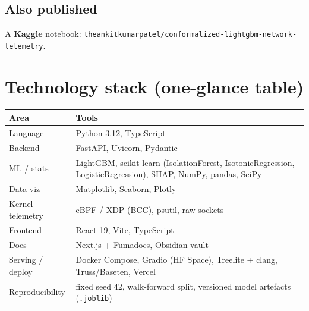 \documentclass[11pt,a4paper]{article}
\begin{document}
\subsection{Also published}
A \textbf{Kaggle} notebook: \texttt{theankitkumarpatel/conformalized-lightgbm-network-telemetry}.

\section{Technology stack (one-glance table)}
\begin{center}
\begin{tabularx}{\linewidth}{@{}p{3.4cm}X@{}}
\toprule
\textbf{Area} & \textbf{Tools} \\
\midrule
Language & Python 3.12, TypeScript \\
Backend & FastAPI, Uvicorn, Pydantic \\
ML / stats & LightGBM, scikit-learn (IsolationForest, IsotonicRegression, LogisticRegression), SHAP, NumPy, pandas, SciPy \\
Data viz & Matplotlib, Seaborn, Plotly \\
Kernel telemetry & eBPF / XDP (BCC), psutil, raw sockets \\
Frontend & React 19, Vite, TypeScript \\
Docs & Next.js + Fumadocs, Obsidian vault \\
Serving / deploy & Docker Compose, Gradio (HF Space), Treelite + clang, Truss/Baseten, Vercel \\
Reproducibility & fixed seed 42, walk-forward split, versioned model artefacts (\texttt{.joblib}) \\
\bottomrule
\end{tabularx}
\end{center}

\end{document}
